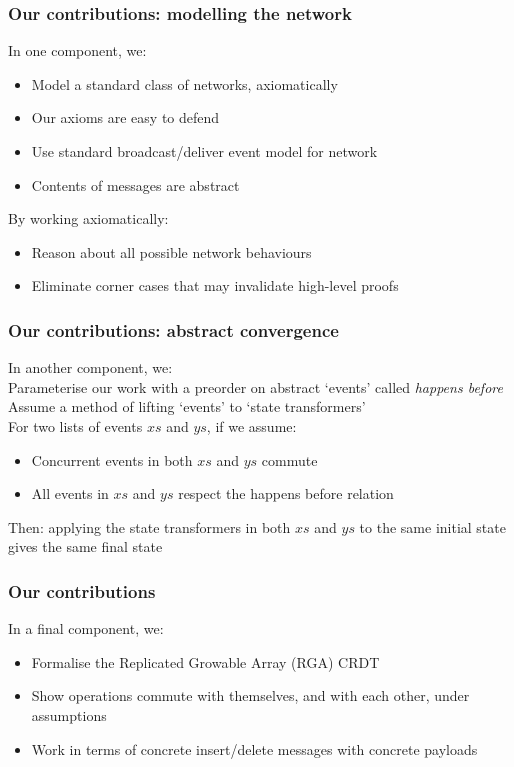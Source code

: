 \documentclass[professionalfonts,smallfonts]{beamer}
\begin{document}
\begin{frame}
\frametitle{Our contributions: modelling the network}
In one component, we:
\begin{itemize}
\item
Model a standard class of networks, axiomatically
\item
Our axioms are easy to defend
\item
Use standard broadcast/deliver event model for network
\item
Contents of messages are abstract
\end{itemize}
By working axiomatically:
\begin{itemize}
\item
Reason about all possible network behaviours
\item
Eliminate corner cases that may invalidate high-level proofs
\end{itemize}
\end{frame}

\begin{frame}
\frametitle{Our contributions: abstract convergence}
In another component, we:
\\[1.5ex]
Parameterise our work with a preorder on abstract `events' called \emph{happens before}
\\[1.5ex]
Assume a method of lifting `events' to `state transformers'
\\[1.5ex]
For two lists of events $xs$ and $ys$, if we assume:
\begin{itemize}
\item
Concurrent events in both $xs$ and $ys$ commute
\item
All events in $xs$ and $ys$ respect the happens before relation
\end{itemize}
Then: applying the state transformers in both $xs$ and $ys$ to the same initial state gives the same final state
\end{frame}

\begin{frame}
\frametitle{Our contributions}
In a final component, we:
\begin{itemize}
\item
Formalise the Replicated Growable Array (RGA) CRDT
\item
Show operations commute with themselves, and with each other, under assumptions
\item
Work in terms of concrete insert/delete messages with concrete payloads
\end{itemize}
\end{frame}
\end{document}

